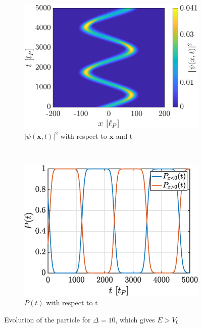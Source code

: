 \documentclass[a4paper,12pt,twoside]{article}
\newcommand{\mbf}[1]{\mathbf{#1}} %
\begin{document}
\begin{figure}[h]
  \centering
  \begin{subfigure}[t]{0.45\textwidth}
    \includegraphics[width=\textwidth]{graphs/iii_evo_Egeqv0_evo.eps}
    \caption{$|\psi(\mbf{x}, t)|^2$ with respect to $\mbf{x}$ and t}
    \label{fig:iii_evo_Egeqv0_evo}
  \end{subfigure}
  ~
  \begin{subfigure}[t]{0.45\textwidth}
    \includegraphics[width=\textwidth]{graphs/iii_evo_Egeqv0_prob.eps}
    \caption{$P(t)$ with respect to t}
    \label{fig:iii_evo_Egeqv0_prob}
  \end{subfigure}
  \caption{Evolution of the particle for $\Delta = 10$, which gives $E > V_0$}
  \label{fig:iii_evo_Egeqv0}
\end{figure}
\end{document}
